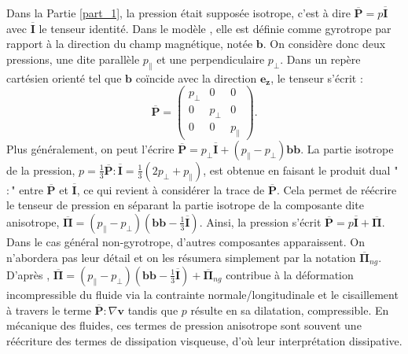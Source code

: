   Dans la Partie \ref{part_1}, la pression était supposée isotrope, c'est à dire $\overline{\boldsymbol{P}} = p \overline{\boldsymbol{I}}$ avec $\overline{\boldsymbol{I}}$ le tenseur identité. Dans le modèle , elle est définie comme gyrotrope par rapport à la direction du champ magnétique, notée $\boldsymbol{b}$. On considère donc deux pressions, une dite parallèle $p_{\parallel}$ et une perpendiculaire $p_{\perp}$. Dans un repère cartésien orienté tel que $\boldsymbol{b}$ coïncide avec la direction $\boldsymbol{e_z}$, le tenseur s'écrit : 
\begin{equation*}
 \overline{\boldsymbol{P}} = \left( \begin{array}{ccc}
                                    p_{\perp} & 0 & 0 \\
                                    0 & p_{\perp} & 0 \\
                                    0 & 0 & p_{\parallel} 
                                    \end{array} \right).   
\end{equation*}
Plus généralement, on peut l'écrire $ \overline{\boldsymbol{P}} = p_{\perp} \overline{\boldsymbol{I}} + \left(p_{\parallel} - p_{\perp}\right) \boldsymbol{b}\boldsymbol{b} $. La partie isotrope de la pression, $p = \frac{1}{3} \overline{\boldsymbol{P}} : \overline{\boldsymbol{I}} = \frac{1}{3} \left(2 p_{\perp} + p_{\parallel} \right) $, est obtenue en faisant le produit dual "$:$" entre $\overline{\boldsymbol{P}}$ et  $\overline{\boldsymbol{I}}$, ce qui revient à considérer la trace de $\overline{\boldsymbol{P}}$. Cela permet de réécrire le tenseur de pression en séparant la partie isotrope de la composante dite anisotrope, $\overline{\boldsymbol{\Pi}} =  \left(p_{\parallel} - p_{\perp}\right)\left(\boldsymbol{b}\boldsymbol{b} - \frac{1}{3} \overline{\boldsymbol{I}} \right)$. Ainsi, la pression s'écrit $\overline{\boldsymbol{P}} = p \overline{\boldsymbol{I}} +\overline{\boldsymbol{\Pi}}$. Dans le cas général non-gyrotrope, d'autres composantes apparaissent. On n'abordera pas leur détail et on les résumera simplement par la notation $\overline{\boldsymbol{\Pi}}_{ng}$. D'après \cite{cassak_pressure-strain_2022}, $\overline{\boldsymbol{\Pi}} = \left(p_{\parallel} - p_{\perp}\right)\left(\boldsymbol{b}\boldsymbol{b} - \frac{1}{3} \overline{\boldsymbol{I}} \right) + \overline{\boldsymbol{\Pi}}_{ng}$ contribue à la déformation incompressible du fluide via la contrainte normale/longitudinale et le cisaillement à travers le terme $\overline{\boldsymbol{P}} : \nabla \boldsymbol{v}$ tandis que $p$ résulte en sa dilatation, compressible. En mécanique des fluides, ces termes de pression anisotrope sont souvent une réécriture des termes de dissipation visqueuse, d'où leur interprétation dissipative. 

